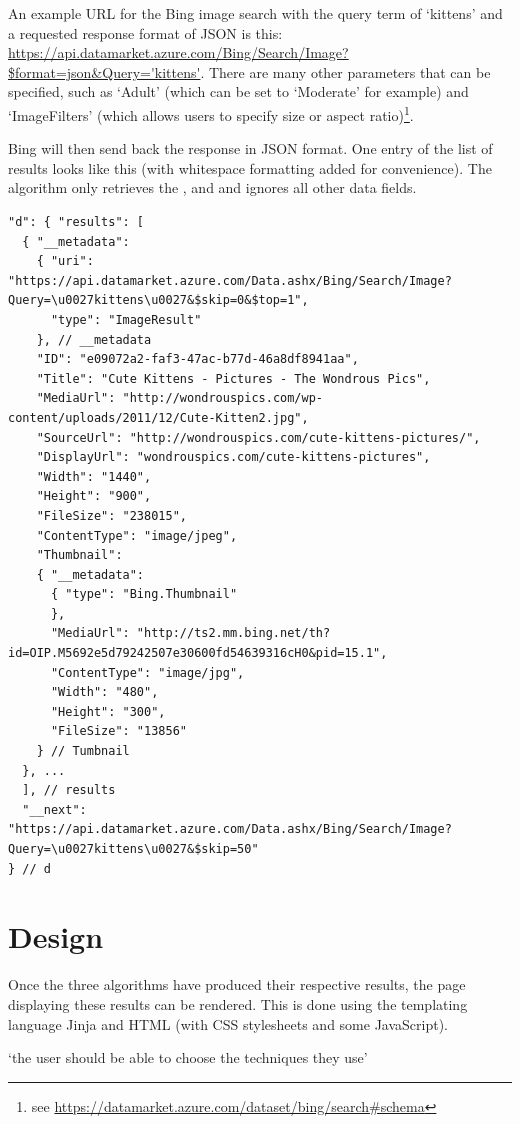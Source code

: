 An example \ac{URL} for the Bing image search with the query term of `kittens' and a requested response format of \ac{JSON} is this:
\url{https://api.datamarket.azure.com/Bing/Search/Image?$format=json&Query='kittens'}. There are many other parameters that can be specified, such as `Adult' (which can be set to `Moderate' for example) and `ImageFilters' (which allows users to specify size or aspect ratio)\footnote{see \url{https://datamarket.azure.com/dataset/bing/search\#schema}}.

Bing will then send back the response in \ac{JSON} format. One entry of the list of results looks like this (with whitespace formatting added for convenience). The algorithm only retrieves the ,  and  and ignores all other data fields.

\begin{verbatim}
"d": { "results": [
  { "__metadata":
    { "uri": "https://api.datamarket.azure.com/Data.ashx/Bing/Search/Image?Query=\u0027kittens\u0027&$skip=0&$top=1",
      "type": "ImageResult"
    }, // __metadata
    "ID": "e09072a2-faf3-47ac-b77d-46a8df8941aa",
    "Title": "Cute Kittens - Pictures - The Wondrous Pics",
    "MediaUrl": "http://wondrouspics.com/wp-content/uploads/2011/12/Cute-Kitten2.jpg",
    "SourceUrl": "http://wondrouspics.com/cute-kittens-pictures/",
    "DisplayUrl": "wondrouspics.com/cute-kittens-pictures",
    "Width": "1440",
    "Height": "900",
    "FileSize": "238015",
    "ContentType": "image/jpeg",
    "Thumbnail":
    { "__metadata":
      { "type": "Bing.Thumbnail"
      },
      "MediaUrl": "http://ts2.mm.bing.net/th?id=OIP.M5692e5d79242507e30600fd54639316cH0&pid=15.1",
      "ContentType": "image/jpg",
      "Width": "480",
      "Height": "300",
      "FileSize": "13856"
    } // Tumbnail
  }, ...
  ], // results
  "__next": "https://api.datamarket.azure.com/Data.ashx/Bing/Search/Image?Query=\u0027kittens\u0027&$skip=50"
} // d
\end{verbatim}


\section{Design}

Once the three algorithms have produced their respective results, the page displaying these results can be rendered. This is done using the templating language Jinja and \ac{HTML} (with \ac{CSS} stylesheets and some JavaScript).

`the user should be able to choose the techniques they use' \autocite{Hendler2011}


